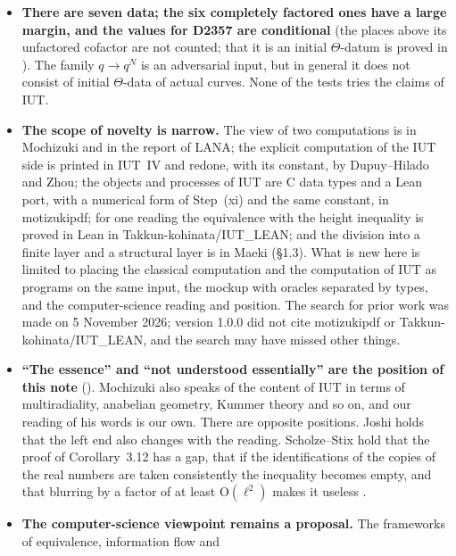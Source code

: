 \documentclass[11pt,a4paper]{article}
\newcommand{\lab}[2]{{\upshape\fcolorbox{#1}{#1!8}{\scriptsize\sffamily\bfseries\textcolor{#1}{#2}}}}
\newcommand{\tagH}{\lab{BurntOrange}{H}}
\begin{document}
\begin{itemize}
places above 3 and 5. The places above $2,3,5,\ell$ are set to 0 in the hull and bounded by Step~(ii) and (R4) in the
upper bound. The ramification index of $K$ at bad places is assumed by the formula of the catalogue except above $p$.
D2357 has an unfactored cofactor of 1564 digits whose places are not counted.
\item \textbf{There are seven data; the six completely factored ones have a large margin, and the values for D2357 are
conditional} (the places above its unfactored cofactor are not counted; that it is an initial $\Theta$-datum is proved
in \cite[Theorem~2.1]{Fourteen}). The family $q\to q^N$ is an adversarial input, but in
general it does not consist of initial $\Theta$-data of actual curves. None of the tests tries the claims of IUT.
\item \textbf{The scope of novelty is narrow.} The view of two computations is in Mochizuki and in the report of LANA;
the explicit computation of the IUT side is printed in IUT~IV and redone, with its constant, by Dupuy--Hilado and Zhou;
the objects and processes of IUT are C data types and a Lean port, with a numerical form of Step~(xi) and the same
constant, in motizukipdf; for one reading the equivalence with the height inequality is proved in Lean in
Takkun-kohinata/IUT\_LEAN; and the division into a finite layer and a structural layer is in Maeki (\S1.3). What is new
here is limited to placing the classical computation and the computation of IUT as programs on the same input, the
mockup with oracles separated by types, and the computer-science reading and position. The search for prior work was
made on 5 November 2026; version 1.0.0 did not cite motizukipdf or Takkun-kohinata/IUT\_LEAN, and the search may have
missed other things.
\item \textbf{``The essence'' and ``not understood essentially'' are the position of this note} (\tagH). Mochizuki also
speaks of the content of IUT in terms of multiradiality, anabelian geometry, Kummer theory and so on, and our reading of
his words is our own. There are opposite positions. Joshi holds that the left end also changes with the reading.
Scholze--Stix hold that the proof of Corollary~3.12 has a gap, that if the identifications of the copies of the real
numbers are taken consistently the inequality becomes empty, and that blurring by a factor of at least
$\mathrm{O}(\ell^2)$ makes it useless \cite[\S2.2]{SS}.
\item \textbf{The computer-science viewpoint remains a proposal.} The frameworks of equivalence, information flow and

\end{itemize}
\end{document}
